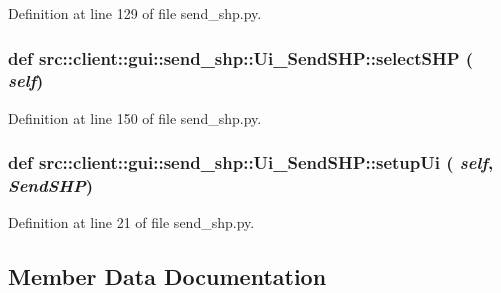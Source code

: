 Definition at line 129 of file send\_\-shp.py.

\hypertarget{classsrc_1_1client_1_1gui_1_1send__shp_1_1Ui__SendSHP_a1086d51c284cbe57f91713c7aeb4bc0b}{
\subsubsection[{selectSHP}]{\setlength{\rightskip}{0pt plus 5cm}def src::client::gui::send\_\-shp::Ui\_\-SendSHP::selectSHP ( {\em self})}}
\label{classsrc_1_1client_1_1gui_1_1send__shp_1_1Ui__SendSHP_a1086d51c284cbe57f91713c7aeb4bc0b}


Definition at line 150 of file send\_\-shp.py.

\hypertarget{classsrc_1_1client_1_1gui_1_1send__shp_1_1Ui__SendSHP_ac1cadbd0e0dd7104d2b5cb1efb5cd3a2}{
\subsubsection[{setupUi}]{\setlength{\rightskip}{0pt plus 5cm}def src::client::gui::send\_\-shp::Ui\_\-SendSHP::setupUi ( {\em self}, \/   {\em SendSHP})}}
\label{classsrc_1_1client_1_1gui_1_1send__shp_1_1Ui__SendSHP_ac1cadbd0e0dd7104d2b5cb1efb5cd3a2}


Definition at line 21 of file send\_\-shp.py.



\subsection{Member Data Documentation}
\hypertarget{classsrc_1_1client_1_1gui_1_1send__shp_1_1Ui__SendSHP_a90b56feeb7f890a314388d4b5b27e749}{
\subsubsection[{db\_\-table}]{}}
\label{classsrc_1_1client_1_1gui_1_1send__shp_1_1Ui__SendSHP_a90b56feeb7f890a314388d4b5b27e749}



